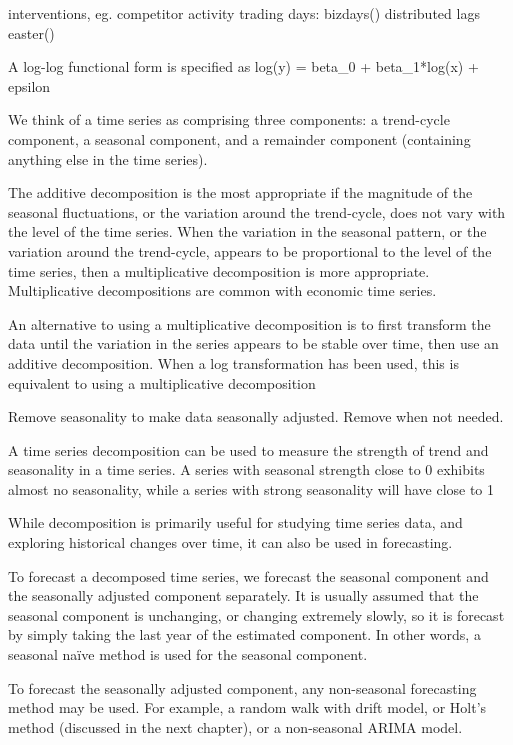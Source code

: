 \documentclass[]{book}
\begin{document}
interventions, eg. competitor activity \textbar{} trading days: bizdays() \textbar{} distributed lags \textbar{} easter()

A log-log functional form is specified as log(y) = beta\_0 + beta\_1*log(x) + epsilon

We think of a time series as comprising three components: a trend-cycle component, a seasonal component, and a remainder component (containing anything else in the time series).

The additive decomposition is the most appropriate if the magnitude of the seasonal fluctuations, or the variation around the trend-cycle, does not vary with the level of the time series. When the variation in the seasonal pattern, or the variation around the trend-cycle, appears to be proportional to the level of the time series, then a multiplicative decomposition is more appropriate. Multiplicative decompositions are common with economic time series.

An alternative to using a multiplicative decomposition is to first transform the data until the variation in the series appears to be stable over time, then use an additive decomposition. When a log transformation has been used, this is equivalent to using a multiplicative decomposition

Remove seasonality to make data seasonally adjusted. Remove when not needed.

A time series decomposition can be used to measure the strength of trend and seasonality in a time series. A series with seasonal strength close to 0 exhibits almost no seasonality, while a series with strong seasonality will have close to 1

While decomposition is primarily useful for studying time series data, and exploring historical changes over time, it can also be used in forecasting.

To forecast a decomposed time series, we forecast the seasonal component and the seasonally adjusted component separately. It is usually assumed that the seasonal component is unchanging, or changing extremely slowly, so it is forecast by simply taking the last year of the estimated component. In other words, a seasonal naïve method is used for the seasonal component.

To forecast the seasonally adjusted component, any non-seasonal forecasting method may be used. For example, a random walk with drift model, or Holt's method (discussed in the next chapter), or a non-seasonal ARIMA model.
\end{document}
